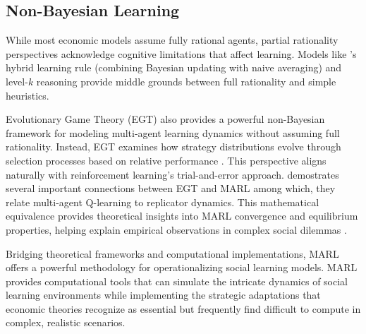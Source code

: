 \subsection{Non-Bayesian Learning}

While most economic models assume fully rational agents, partial rationality perspectives acknowledge cognitive limitations that affect learning. Models like \citet{jadbabaie2012non}'s hybrid learning rule (combining Bayesian updating with naive averaging) and level-$k$ reasoning \citep{stahl1994experimental, crawford2007level} provide middle grounds between full rationality and simple heuristics.
\iffalse
Research on information processing constraints, such as bounded memory \citep{monte2014bounded} and rational inattention \citep{sims2003implications}, further illustrates how cognitive limitations shape learning outcomes. Behavioral biases like confirmation bias \citep{rabin1999psychology}, correlation neglect \citep{enke2019correlation}, and naive herding \citep{eyster2010naive} additionally affect how agents process social information. These behavioral factors often exacerbate herding behavior and information cascades, creating a gap between theoretical predictions based on full rationality and observed behavior. Our MARL framework provides a computational approach to modeling partial rationality that captures these behavioral patterns while maintaining analytical tractability.
\fi

Evolutionary Game Theory (EGT) also provides a powerful non-Bayesian framework for modeling multi-agent learning dynamics without assuming full rationality. Instead, EGT examines how strategy distributions evolve through selection processes based on relative performance \citep{weibull1997evolutionary}. This perspective aligns naturally with reinforcement learning's trial-and-error approach. \citet{tuyls2004evolutionary} demostrates several important connections between EGT and MARL among which, they relate multi-agent Q-learning to replicator dynamics. This mathematical equivalence provides theoretical insights into MARL convergence and equilibrium properties, helping explain empirical observations in complex social dilemmas \citep{leibo2017multi}.

Bridging theoretical frameworks and computational implementations, MARL offers a powerful methodology for operationalizing social learning models. MARL provides computational tools that can simulate the intricate dynamics of social learning environments while implementing the strategic adaptations that economic theories recognize as essential but frequently find difficult to compute in complex, realistic scenarios.

